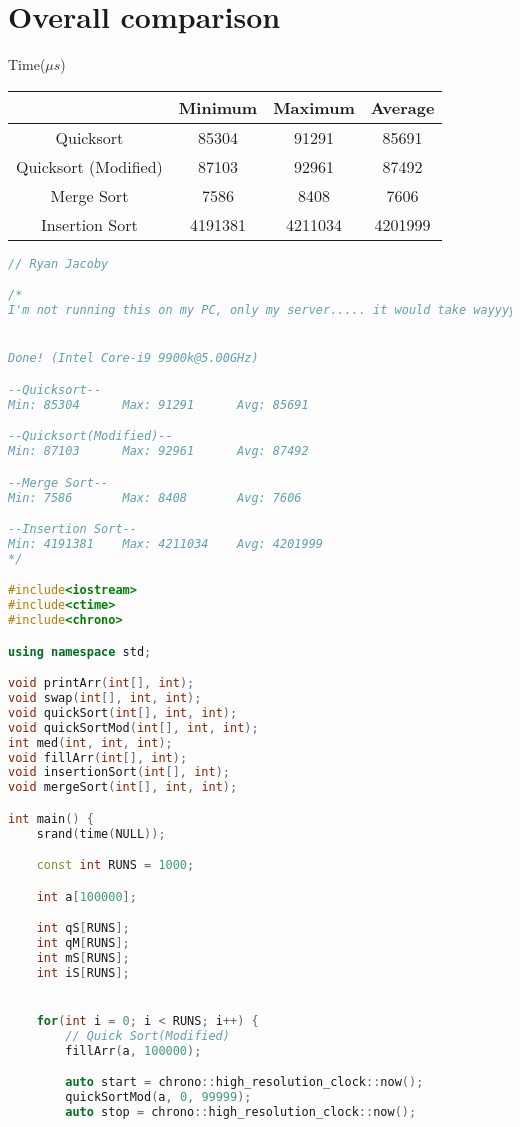 \documentclass[letterpaper, 11pt]{article}
\begin{document}
\section{Overall comparison}

Time($\mu s$) \\
\begin{tabular}{c || c c c}
     & Minimum & Maximum & Average \\
    \hline \hline
    Quicksort & 85304 & 91291 & 85691 \\
    Quicksort (Modified) & 87103 & 92961 & 87492 \\
    Merge Sort & 7586 & 8408 & 7606 \\
    Insertion Sort & 4191381 & 4211034 & 4201999 
\end{tabular}

\begin{lstlisting}[language=c++, caption=main.cpp]
// Ryan Jacoby

/* 
I'm not running this on my PC, only my server..... it would take wayyyy too long.


Done! (Intel Core-i9 9900k@5.00GHz)

--Quicksort--
Min: 85304      Max: 91291      Avg: 85691

--Quicksort(Modified)--
Min: 87103      Max: 92961      Avg: 87492

--Merge Sort--
Min: 7586       Max: 8408       Avg: 7606

--Insertion Sort--
Min: 4191381    Max: 4211034    Avg: 4201999
*/

#include<iostream>
#include<ctime>
#include<chrono>

using namespace std;

void printArr(int[], int);
void swap(int[], int, int);
void quickSort(int[], int, int);
void quickSortMod(int[], int, int);
int med(int, int, int);
void fillArr(int[], int);
void insertionSort(int[], int);
void mergeSort(int[], int, int);

int main() {
    srand(time(NULL));

    const int RUNS = 1000;

    int a[100000];

    int qS[RUNS];
    int qM[RUNS];
    int mS[RUNS];
    int iS[RUNS];


    for(int i = 0; i < RUNS; i++) {
        // Quick Sort(Modified)
        fillArr(a, 100000);

        auto start = chrono::high_resolution_clock::now();
        quickSortMod(a, 0, 99999);
        auto stop = chrono::high_resolution_clock::now();


\end{lstlisting}
\end{document}
